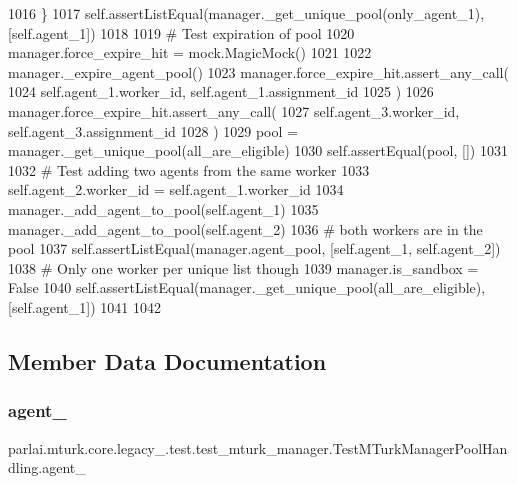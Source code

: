\begin{DoxyCode}
1016         \}
1017         self.assertListEqual(manager.\_get\_unique\_pool(only\_agent\_1), [self.agent\_1])
1018 
1019         \textcolor{comment}{# Test expiration of pool}
1020         manager.force\_expire\_hit = mock.MagicMock()
1021 
1022         manager.\_expire\_agent\_pool()
1023         manager.force\_expire\_hit.assert\_any\_call(
1024             self.agent\_1.worker\_id, self.agent\_1.assignment\_id
1025         )
1026         manager.force\_expire\_hit.assert\_any\_call(
1027             self.agent\_3.worker\_id, self.agent\_3.assignment\_id
1028         )
1029         pool = manager.\_get\_unique\_pool(all\_are\_eligible)
1030         self.assertEqual(pool, [])
1031 
1032         \textcolor{comment}{# Test adding two agents from the same worker}
1033         self.agent\_2.worker\_id = self.agent\_1.worker\_id
1034         manager.\_add\_agent\_to\_pool(self.agent\_1)
1035         manager.\_add\_agent\_to\_pool(self.agent\_2)
1036         \textcolor{comment}{# both workers are in the pool}
1037         self.assertListEqual(manager.agent\_pool, [self.agent\_1, self.agent\_2])
1038         \textcolor{comment}{# Only one worker per unique list though}
1039         manager.is\_sandbox = \textcolor{keyword}{False}
1040         self.assertListEqual(manager.\_get\_unique\_pool(all\_are\_eligible), [self.agent\_1])
1041 
1042 
\end{DoxyCode}


\subsection{Member Data Documentation}
\mbox{\label{classparlai_1_1mturk_1_1core_1_1legacy__2018_1_1test_1_1test__mturk__manager_1_1TestMTurkManagerPoolHandling_a9687ff918de01e0c3cbf9d913e73cecd}} 
\subsubsection{\texorpdfstring{agent\+\_}{agent\_1}}
{\footnotesize\ttfamily parlai.\+mturk.\+core.\+legacy\+\_.\+test.\+test\+\_\+mturk\+\_\+manager.\+Test\+M\+Turk\+Manager\+Pool\+Handling.\+agent\+\_}



